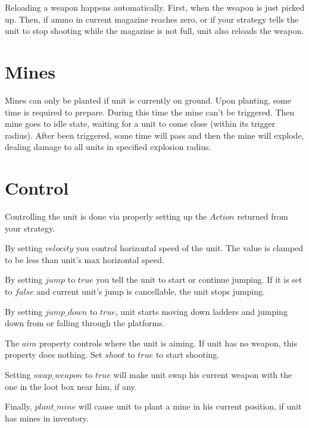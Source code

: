 Reloading a weapon happens automatically. First, when the weapon is just picked up.
Then, if ammo in current magazine reaches zero,
or if your strategy tells the unit to stop shooting while the magazine is not full,
unit also reloads the weapon.

\section{Mines}

Mines can only be planted if unit is currently on ground.
Upon planting, some time is required to prepare. During this time the mine can't be triggered.
Then mine goes to idle state, waiting for a unit to come close (within its trigger radius).
After been triggered, some time will pass and then the mine will explode, dealing damage to all units in specified explosion radius.

\section{Control}

Controlling the unit is done via properly setting up the $Action$ returned from your strategy.

By setting $velocity$ you control horizontal speed of the unit. The value is clamped to be less than unit's max horizontal speed.

By setting $jump$ to $true$ you tell the unit to start or continue jumping.
If it is set to $false$ and current unit's jump is cancellable, the unit stops jumping.

By setting $jump\_down$ to $true$, unit starts moving down ladders and jumping down from or falling through the platforms.

The $aim$ property controls where the unit is aiming. If unit has no weapon, this property does nothing.
Set $shoot$ to $true$ to start shooting.

Setting $swap\_weapon$ to $true$ will make unit swap his current weapon with the one in the loot box near him, if any.

Finally, $plant\_mine$ will cause unit to plant a mine in his current position, if unit has mines in inventory.